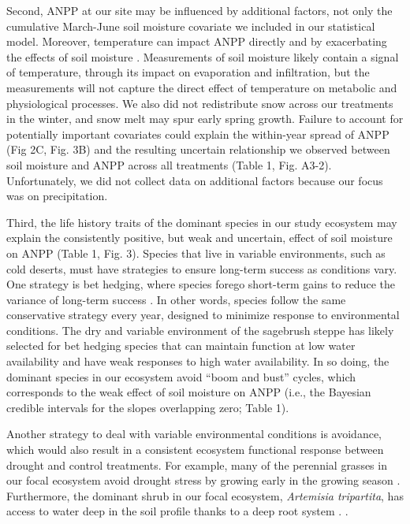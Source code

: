 \documentclass[fleqn,10pt,lineno]{wlpeerj} %
\begin{document}
Second, ANPP at our site may be influenced by additional factors, not
only the cumulative March-June soil moisture covariate we included in
our statistical model.  \citet{LaPierre2016}
Moreover, temperature can impact ANPP directly \citep{Epstein1997} and
by exacerbating the effects of soil moisture \citep{DeBoeck2011}.
Measurements of soil moisture likely contain a signal of temperature,
through its impact on evaporation and infiltration, but the measurements
will not capture the direct effect of temperature on metabolic and
physiological processes. We also did not redistribute snow across our
treatments in the winter, and snow melt may spur early spring growth.
Failure to account for potentially important covariates could explain
the within-year spread of ANPP (Fig 2C, Fig. 3B) and the resulting
uncertain relationship we observed between soil moisture and ANPP across
all treatments (Table 1, Fig. A3-2). Unfortunately, we did not collect
data on additional factors because our focus was on precipitation.

Third, the life history traits of the dominant species in our study
ecosystem may explain the consistently positive, but weak and uncertain,
effect of soil moisture on ANPP (Table 1, Fig. 3). Species that live in
variable environments, such as cold deserts, must have strategies to
ensure long-term success as conditions vary. One strategy is bet
hedging, where species forego short-term gains to reduce the variance of
long-term success \citep{Seger1987}. In other words, species follow the
same conservative strategy every year, designed to minimize response to
environmental conditions. The dry and variable environment of the
sagebrush steppe has likely selected for bet hedging species that can
maintain function at low water availability and have weak responses to
high water availability. In so doing, the dominant species in our
ecosystem avoid ``boom and bust'' cycles, which corresponds to the weak
effect of soil moisture on ANPP (i.e., the Bayesian credible intervals
for the slopes overlapping zero; Table 1).

Another strategy to deal with variable environmental conditions is
avoidance, which would also result in a consistent ecosystem functional
response between drought and control treatments. For example, many of
the perennial grasses in our focal ecosystem avoid drought stress by
growing early in the growing season \citep[A.R. Kleinhesselink, personal
observation]{Blaisdell1958}. Furthermore, the dominant shrub in our
focal ecosystem, \emph{Artemisia tripartita}, has access to water deep
in the soil profile thanks to a deep root system
\citep{Kulmatiski2017a}.
\citep[e.g.,][]{Huxman2004, Knapp2015, Wilcox2017}.
\end{document}

